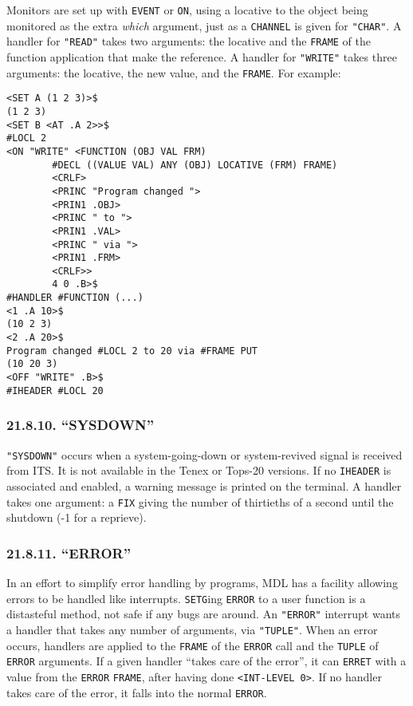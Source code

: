 \documentclass[a4paper,]{article}
\begin{document}
Monitors are set up with \texttt{EVENT} or \texttt{ON}, using a locative to the object being monitored as the extra
\emph{which} argument, just as a \texttt{CHANNEL} is given for \texttt{"CHAR"}. A handler for \texttt{"READ"} takes two
arguments: the locative and the \texttt{FRAME} of the function application that make the reference. A handler for
\texttt{"WRITE"} takes three arguments: the locative, the new value, and the \texttt{FRAME}. For example:

\begin{verbatim}
<SET A (1 2 3)>$
(1 2 3)
<SET B <AT .A 2>>$
#LOCL 2
<ON "WRITE" <FUNCTION (OBJ VAL FRM)
        #DECL ((VALUE VAL) ANY (OBJ) LOCATIVE (FRM) FRAME)
        <CRLF>
        <PRINC "Program changed ">
        <PRIN1 .OBJ>
        <PRINC " to ">
        <PRIN1 .VAL>
        <PRINC " via ">
        <PRIN1 .FRM>
        <CRLF>>
        4 0 .B>$
#HANDLER #FUNCTION (...)
<1 .A 10>$
(10 2 3)
<2 .A 20>$
Program changed #LOCL 2 to 20 via #FRAME PUT
(10 20 3)
<OFF "WRITE" .B>$
#IHEADER #LOCL 20
\end{verbatim}

\subsubsection{\texorpdfstring{21.8.10. ``SYSDOWN''}{21.8.10. SYSDOWN}}\label{sysdown}

\texttt{"SYSDOWN"}  occurs when a system-going-down or system-revived signal is received
from ITS. It is not available in the Tenex or Tops-20
versions. If no \texttt{IHEADER} is associated and enabled, a warning message is printed on the terminal. A handler takes
one argument: a \texttt{FIX} giving the number of thirtieths of a second until the shutdown (-1 for a reprieve).

\subsubsection{\texorpdfstring{21.8.11. ``ERROR''}{21.8.11. ERROR}}\label{error-1}

 In an effort to simplify error handling by programs, MDL has a facility allowing errors
to be handled like interrupts. \texttt{SETG}ing \texttt{ERROR} to a user function is a distasteful method, not safe if any
bugs are around. An \texttt{"ERROR"} interrupt wants a handler that takes any number of arguments, via \texttt{"TUPLE"}.
When an error occurs, handlers are applied to the \texttt{FRAME} of the \texttt{ERROR} call and the \texttt{TUPLE} of
\texttt{ERROR} arguments. If a given handler ``takes care of the error'', it can \texttt{ERRET} with a value from the
\texttt{ERROR} \texttt{FRAME}, after having done \texttt{\textless{}INT-LEVEL\ 0\textgreater{}}. If no handler takes care
of the error, it falls into the normal \texttt{ERROR}.
\end{document}
